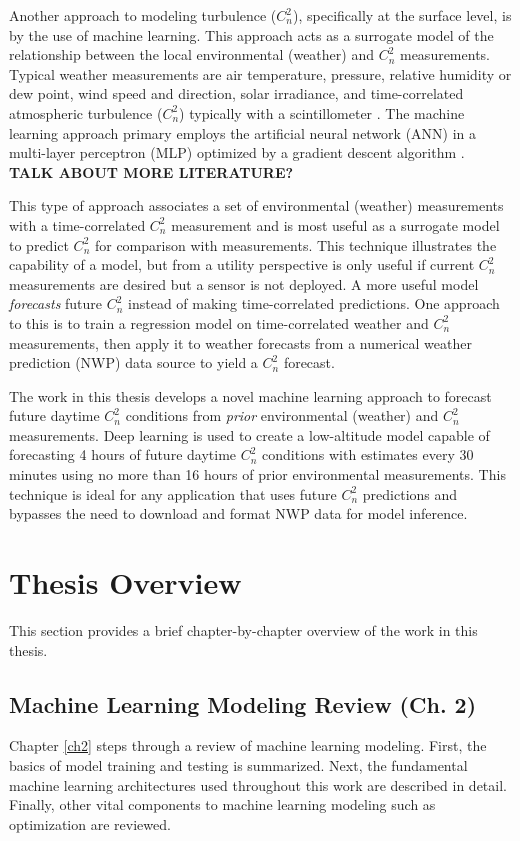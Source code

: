 Another approach to modeling turbulence ($C_{n}^{2}$), specifically at the surface level, is by the use of machine learning. This approach acts as a surrogate model of the relationship between the local environmental (weather) and $C_{n}^{2}$ measurements. Typical weather measurements are air temperature, pressure, relative humidity or dew point, wind speed and direction, solar irradiance, and time-correlated atmospheric turbulence ($C_{n}^{2}$) typically with a scintillometer \cite{Jellen:20, Su:20, Wang:2014}. The machine learning approach primary employs the artificial neural network (ANN) in a multi-layer perceptron (MLP) optimized by a gradient descent algorithm \cite{Su:20, Wang:2014}. \textbf{TALK ABOUT MORE LITERATURE?}

This type of approach associates a set of environmental (weather) measurements with a time-correlated $C_{n}^{2}$ measurement and is most useful as a surrogate model to predict $C_{n}^{2}$ for comparison with measurements. This technique illustrates the capability of a model, but from a utility perspective is only useful if current $C_{n}^{2}$ measurements are desired but a sensor is not deployed. A more useful model \emph{forecasts} future $C_{n}^{2}$ instead of making time-correlated predictions. One approach to this is to train a regression model on time-correlated weather and $C_{n}^{2}$ measurements, then apply it to weather forecasts from a numerical weather prediction (NWP) data source to yield a $C_{n}^{2}$ forecast.

The work in this thesis develops a novel machine learning approach to forecast future daytime $C_{n}^{2}$ conditions from \emph{prior} environmental (weather) and $C_{n}^{2}$ measurements. Deep learning is used to create a low-altitude model capable of forecasting 4 hours of future daytime $C_{n}^{2}$ conditions with estimates every 30 minutes using no more than 16 hours of prior environmental measurements. This technique is ideal for any application that uses future $C_{n}^{2}$ predictions and bypasses the need to download and format NWP data for model inference.

\section{Thesis Overview}
This section provides a brief chapter-by-chapter overview of the work in this thesis.

\subsection{Machine Learning Modeling Review (Ch. 2)}
Chapter \ref{ch2} steps through a review of machine learning modeling. First, the basics of model training and testing is summarized. Next, the fundamental machine learning architectures used throughout this work are described in detail. Finally, other vital components to machine learning modeling such as optimization are reviewed.

